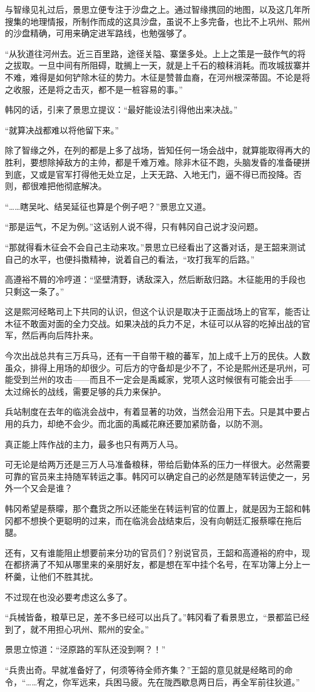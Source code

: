与智缘见礼过后，景思立便专注于沙盘之上。通过智缘携回的地图，以及这几年所搜集的地理情报，所制作而成的这具沙盘，虽说不上多完备，也比不上巩州、熙州的沙盘精确，可用来确定进军路线，也勉强够了。

“从狄道往河州去。近三百里路，途径关隘、寨堡多处。上上之策是一鼓作气的将之拔取。一旦中间有所阻碍，耽搁上一天，就是上千石的粮秣消耗。而攻城拔寨并不难，难得是如何铲除木征的势力。木征是赞普血裔，在河州根深蒂固。不论是将之收服，还是将之击灭，都不是一桩容易的事。”

韩冈的话，引来了景思立提议：“最好能设法引得他出来决战。”

“就算决战都难以将他留下来。”

除了智缘之外，在列的都是上多了战场，皆知任何一场会战中，就算能取得再大的胜利，要想除掉敌方的主帅，都是千难万难。除非木征不跑，头脑发昏的准备硬拼到底，又或是官军打得他无处立足，上天无路、入地无门，逼不得已而投降。否则，都很难把他彻底解决。

“……瞎吴叱、结吴延征也算是个例子吧？”景思立又道。

“那是运气，不足为例。”这话别人说不得，只有韩冈自己说才没问题。

“那就得看木征会不会自己主动来攻。”景思立已经看出了这番对话，是王韶来测试自己的水平，也便抖擞精神，说着自己的看法，“攻打我军的后路。”

高遵裕不屑的冷哼道：“坚壁清野，诱敌深入，然后断敌归路。木征能用的手段也只剩这一条了。”

这是熙河经略司上下共同的认识，但这个认识是取决于正面战场上的官军，能否让木征不敢面对面的全力交战。如果决战的兵力不足，木征可以从容的吃掉出战的官军，然后再向后阵扑来。

今次出战总共有三万兵马，还有一干自带干粮的蕃军，加上成千上万的民伕。人数虽众，排得上用场的却很少。可后方的守备却是少不了，不论是熙州还是巩州，可能受到兰州的攻击——而且不一定会是禹臧家，党项人这时候很有可能会出手——太过绵长的战线，需要足够的兵力来保护。

兵站制度在去年的临洮会战中，有着显著的功效，当然会沿用下去。只是其中要占用的兵力，却绝不会少。而北面的禹臧花麻还要加紧防备，以防不测。

真正能上阵作战的主力，最多也只有两万人马。

可无论是给两万还是三万人马准备粮秣，带给后勤体系的压力一样很大。必然需要可靠的官员来主持随军转运之事。韩冈可以确定自己的必然是随军转运使之一，另外一个又会是谁？

韩冈希望是蔡曚，那个蠢货之所以还能坐在转运判官的位置上，就是因为王韶和韩冈都不想换个更聪明的过来，而在临洮会战结束后，没有向朝廷汇报蔡曚在拖后腿。

还有，又有谁能阻止想要前来分功的官员们？别说官员，王韶和高遵裕的府中，现在都挤满了不知从哪里来的亲朋好友，都是想在军中挂个名号，在军功簿上分上一杯羹，让他们不胜其扰。

不过现在也没必要考虑这么多了。

“兵械皆备，粮草已足，差不多已经可以出兵了。”韩冈看了看景思立，“景都监已经到了，就不用担心巩州、熙州的安全。”

景思立惊道：“泾原路的军队还没到啊？！”

“兵贵出奇。早就准备好了，何须等待全师齐集？”王韶的意见就是经略司的命令，“……宥之，你军远来，兵困马疲。先在陇西歇息两日后，再全军前往狄道。”

